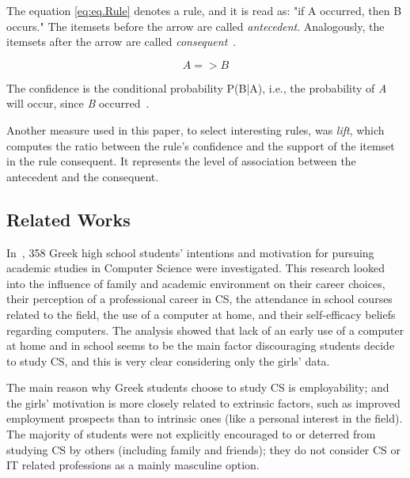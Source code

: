The equation \ref{eq:eq.Rule} denotes a rule, and it is read as: "if A occurred, then B occurs." The itemsets before the arrow are called \emph{antecedent}. Analogously, the itemsets after the arrow are called \emph{consequent}~\cite{Hastie2009}.

\begin{equation}
{A} => {B}
\label{eq:eq.Rule}%
\end{equation}

The confidence is the conditional probability P(B|A), i.e., the probability of \emph{A} will occur, since \emph{B} occurred~\cite{Hastie2009}.

Another measure used in this paper, to select interesting rules, was \emph{lift}, which computes the ratio between the rule's confidence and the support of the itemset in the rule consequent. It represents the level of association between the antecedent and the consequent.~\cite{tan2006introduction}


%

\subsection{Related Works}\label{sec:background:related}%

In~\cite{papastergiou_are_2008}, 358 Greek high school students' intentions and motivation for pursuing academic studies in Computer Science were investigated. This research looked into the influence of family and academic environment on their career choices, their perception of a professional career in CS, the attendance in school courses related to the field, the use of a computer at home, and their self-efficacy beliefs regarding computers. The analysis showed that lack of an early use of a computer at home and in school seems to be the main factor discouraging students decide to study CS, and this is very clear considering only the girls' data.

The main reason why Greek students choose to study CS is employability; and the girls' motivation is more closely related to extrinsic factors, such as improved employment prospects than to intrinsic ones (like a personal interest in the field). The majority of students were not explicitly encouraged to or deterred from studying CS by others (including family and friends); they do not consider CS or IT related professions as a mainly masculine option.

